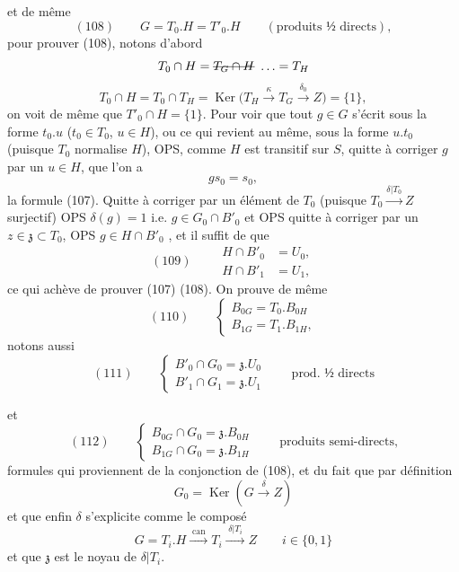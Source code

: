 \documentclass[11pt,a4paper]{article}
\begin{document}

et de même
\[
(108)\qquad G = T_0.H = T'_0.H \qquad (\text{produits ½ directs}) ,
\]
pour prouver (108), notons d'abord
\[
T_0\cap H = \text{\struck{$T_G\cap H$}}\ \ldots = T_H
\]
\[
T_0\cap H = T_0\cap T_H = \operatorname{Ker}\bigl(T_H \xrightarrow{\;\kappa\;} T_G
\xrightarrow{\;\delta_0\;} Z\bigr) = \{1\} ,
\]
on voit de même que $T'_0\cap H = \{1\}$. Pour voir que tout $g\in G$ s'écrit sous la forme
$t_0.u$ ($t_0\in T_0$, $u\in H$), ou ce qui revient au même, sous la forme $u.t_0$ (puisque
$T_0$ normalise $H$), OPS, comme $H$ est transitif sur $S$, quitte à \struck{\ill{}} corriger
$g$ par un $u\in H$, que l'on a
\[
gs_0 = s_0 ,
\]
\ill{} la formule (107). Quitte à corriger par un élément de $T_0$ (puisque
$T_0 \xrightarrow{\delta\vert T_0} Z$ surjectif) OPS $\delta(g) = 1$ i.e. $g\in G_0\cap B'_0$ et
\struck{\ill{}} OPS quitte à corriger par un $z\in\mathfrak{z}\subset T_0$, OPS
$g\in H\cap B'_0$ \struck{\ill{}}, et il suffit de   que
\[
(109)\qquad
\begin{aligned}
H\cap B'_0 &= U_0 ,\\
H\cap B'_1 &= U_1 ,
\end{aligned}
\]
ce qui achève de prouver (107) (108). On prouve de même
\[
(110)\qquad
\begin{cases}
B_{0G} = T_0.B_{0H}\\
B_{1G} = T_1.B_{1H} ,
\end{cases}
\]
notons aussi
\[
(111)\qquad
\begin{cases}
B'_0\cap G_0 = \mathfrak{z}.U_0\\
B'_1\cap G_1 = \mathfrak{z}.U_1
\end{cases}
\qquad \text{prod. ½ directs}
\]

et
\[
(112)\qquad
\begin{cases}
B_{0G}\cap G_0 = \mathfrak{z}.B_{0H}\\
B_{1G}\cap G_0 = \mathfrak{z}.B_{1H}
\end{cases}
\qquad \text{produits semi-directs,}
\]
formules qui proviennent de la conjonction de (108), et du fait que par définition
\[
G_0 = \operatorname{Ker}(G \xrightarrow{\;\delta\;} Z)
\]
et que enfin $\delta$ s'explicite comme le composé
\[
G = T_i.H \xrightarrow{\;\text{can}\;} T_i \xrightarrow{\;\delta\vert T_i\;} Z
\qquad i\in\{0,1\}
\]
et que  $\mathfrak{z}$ est le noyau de $\delta\vert T_i$.
\end{document}
